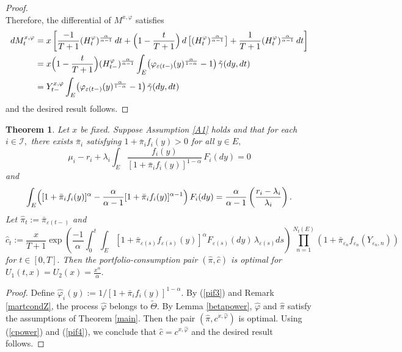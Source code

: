\documentclass[11pt]{article}
\theoremstyle{plain}
\newtheorem{theorem}{Theorem}[section]
\theoremstyle{definition}
\numberwithin{equation}{section}
\newcommand{\calI}{\mathcal{I}}
\newcommand{\eps}{\varepsilon}
\begin{document}
\begin{proof}
\[\]
Therefore, the differential of $M^{x,\varphi}$ satisfies
\begin{align*}
dM_t^{x,\varphi}&=x\left[\frac{-1}{T+1}(H_t^\varphi)^{\frac{\alpha}{\alpha-1}}\,dt+\Bigl(1-\frac{t}{T+1}\Bigr)\,d\left[(H_t^\varphi)^{\frac{\alpha}{\alpha-1}}\right]
+\frac{1}{T+1}(H_t^\varphi)^{\frac{\alpha}{\alpha-1}}\,dt\right]\\
&=x\Bigl(1-\frac{t}{T+1}\Bigr)(H_{t-}^\varphi)^{\frac{\alpha}{\alpha-1}} \int_E\bigl(\varphi_{\eps(t-)}(y)^{\frac{\alpha}{1-\alpha}}-1\bigr)\,\tilde\gamma(dy,dt)\\
&=Y_{t-}^{x,\varphi} \int_E\bigl(\varphi_{\eps(t-)}(y)^{\frac{\alpha}{1-\alpha}}-1\bigr)\,\tilde\gamma(dy,dt)
\end{align*}
and the desired result follows.
\end{proof}

\begin{theorem}\label{thmpower}
Let $x$ be fixed. Suppose  Assumption \ref{A1} holds  and that for each $i\in\calI,$ there exists $\bar{\pi}_i$ satisfying $1+\bar{\pi}_if_i(y)>0$ for all $y\in E,$
\begin{equation}\label{pif3}
\mu_i-r_i+\lambda_i\int_E \frac{f_i(y)}{[1+\bar\pi_i f_i(y)]^{1-\alpha}}\,F_i(dy)=0
\end{equation}
and
\begin{equation}\label{pif4}
\int_E\Bigl([1+\bar\pi_i f_i(y)]^{\alpha}-\frac{\alpha}{\alpha-1}[1+\bar\pi_i f_i(y)]^{\alpha-1}\Bigr)\,F_i(dy)=\frac{\alpha}{\alpha-1}\left(\frac{r_i-\lambda_i}{\lambda_i}\right).
\end{equation}
Let $\hat{\pi}_t:=\bar\pi_{\eps(t-)}$ and
\[
\hat{c}_t:=\frac{x}{T+1}\exp\left(\frac{-1}{\alpha}\int_0^t\int_E\left[1+\bar\pi_{\eps(s)}f_{\eps(s)}(y)\right]^\alpha F_{\eps(s)}(dy)\,\lambda_{\eps(s)}ds\right)
\prod_{n=1}^{N_t(E)}\left(1+\bar\pi_{\eps_n}f_{\eps_n}(Y_{\eps_n,n})\right)
\]
for $t\in [0,T].$ Then the portfolio-consumption pair $(\hat{\pi},\hat{c})$ is optimal for $U_1(t,x)=U_2(x)=\frac{x^\alpha}{\alpha}.$
\end{theorem}
\begin{proof}
Define $\hat\varphi_i(y):=1/[1+\bar{\pi}_if_i(y)]^{1-\alpha}.$ By (\ref{pif3}) and Remark \ref{martcondZ}, the process $\hat{\varphi}$ belongs to $\tilde{\Theta}.$ By Lemma \ref{betapower}, $\hat\varphi$ and $\hat\pi$ satisfy the assumptions of Theorem \ref{main}. Then the pair $(\hat\pi,c^{x,\hat{\varphi}})$ is optimal. Using (\ref{cpower}) and (\ref{pif4}),  we conclude that $\hat{c}=c^{x,\hat{\varphi}}$ and the desired result follows.
\end{proof}
\end{document}
